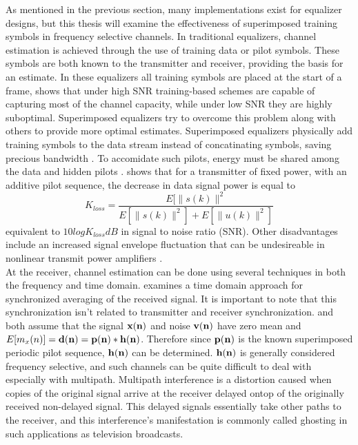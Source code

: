As mentioned in the previous section, many implementations exist for equalizer designs, but this thesis will examine the effectiveness of superimposed training symbols in frequency selective channels.  In traditional equalizers, channel estimation is achieved through the use of training data or pilot symbols.  These symbols are both known to the transmitter and receiver, providing the basis for an estimate.  In these equalizers all training symbols are placed at the start of a frame, \cite{16} shows that under high SNR training-based schemes are capable of capturing most of the channel capacity, while under low SNR they are highly suboptimal.  Superimposed equalizers try to overcome this problem along with others to provide more optimal estimates.  Superimposed equalizers physically add training symbols to the data stream instead of concatinating symbols, saving precious bandwidth \cite{16}.  To accomidate such pilots, energy must be shared among the data and hidden pilots \cite{Ghogho}.  \cite{19} shows that for a transmitter of fixed power, with an additive pilot sequence, the decrease in data signal power is equal to \[ K_{loss}=\frac{E[\|s(k)\|^{2}}{E[\|s(k)\|^{2}]+E[\|u(k)\|^{2}]}\] equivalent to \(10logK_{loss}dB\) in signal to noise ratio (SNR).  Other disadvantages include an increased signal envelope fluctuation that can be undesireable in nonlinear transmit power amplifiers \cite{17}.\\  

At the receiver, channel estimation can be done using several techniques in both the frequency and time domain.  \cite{17} examines a time domain approach for synchronized averaging of the received signal.  It is important to note that this synchronization isn't related to transmitter and receiver synchronization.  \cite{17} and \cite{18} both assume that the signal \( \bf{x}(n)\) and noise \( \bf{v}(n) \) have zero mean and \(E[m_{x}(n)] = \bf{d}(n) = \bf{p}(n) \ast \bf{h}(n)\).  Therefore since \(\bf{p}(n) \) is the known superimposed periodic pilot sequence, \(\bf{h}(n)\) can be determined.  \(\bf{h}(n)\) is generally considered frequency selective, and such channels can be quite difficult to deal with especially with multipath.  Multipath interference is a distortion caused when copies of the original signal arrive at the receiver delayed ontop of the originally received non-delayed signal.  This delayed signals essentially take other paths to the receiver, and this interference's manifestation is commonly called ghosting in such applications as television broadcasts\cite{ghost}.\\

